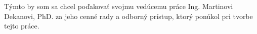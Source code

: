 Týmto by som sa chcel poďakovať svojmu vedúcemu práce Ing. Martinovi Dekanovi, PhD. za jeho cenné rady a odborný prístup, ktorý ponúkol pri tvorbe tejto práce. 